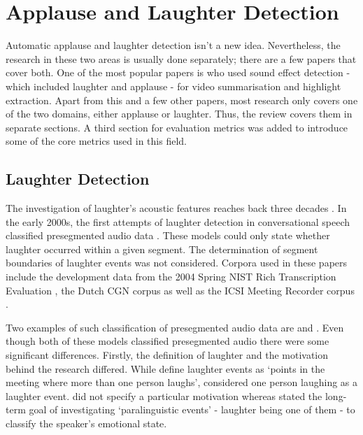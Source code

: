 \documentclass[bsc,frontabs,parskip,deptreport]{infthesis}
\begin{document}
\chapter{Applause and Laughter Detection} \label{cha:bg}
Automatic applause and laughter detection isn't a new idea. Nevertheless, the research in these two areas is usually done separately; there are a few papers that cover both. One of the most popular papers is \citet{cai2003highlight} who used sound effect detection - which included laughter and applause - for video summarisation and highlight extraction.
Apart from this and a few other papers, most research only covers one of the two domains, either applause or laughter. Thus, the review covers them in separate sections. A third section for evaluation metrics was added to introduce some of the core metrics used in this field. 

\section{Laughter Detection} \label{sec:bg-laughter}
The investigation of laughter's acoustic features reaches back three decades \citep{bickley1992acoustic}.
In the early 2000s, the first attempts of laughter detection in conversational speech classified presegmented audio data \citep{kennedy2004laughter, truong2005automatic}. These models could only state whether laughter occurred within a given segment. The determination of segment boundaries of laughter events was not considered. 
Corpora used in these papers include the development data from the 2004 Spring NIST Rich Transcription Evaluation \citep{nist-recordings}, the Dutch CGN corpus \citep{oostdijk2000spoken} as well as the ICSI Meeting Recorder corpus \citep{morgan2001meeting}. 

Two examples of such classification of presegmented audio data are \citet{kennedy2004laughter} and \citet{truong2005automatic}. 
Even though both of these models classified presegmented audio there were some significant differences. 
Firstly, the definition of laughter and the motivation behind the research differed.
While \citet{kennedy2004laughter} define laughter events as `points in the meeting where more than one person laughs', \citet{truong2005automatic} considered one person laughing as a laughter event.
\citet{kennedy2004laughter} did not specify a particular motivation whereas \citet{truong2005automatic} stated the long-term goal of investigating `paralinguistic events' - laughter being one of them - to classify the speaker's emotional state.   
\end{document}
